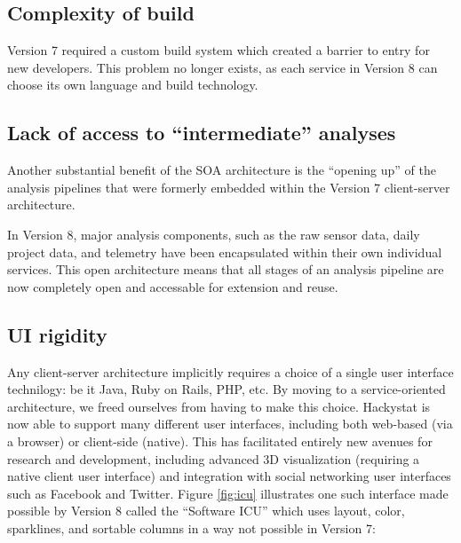 \documentclass[conference,compsoc]{IEEEtran}
\begin{document}





\subsection{Complexity of build}

Version 7 required a custom build system which created a barrier to entry
for new developers.  This problem no longer exists, as each service in
Version 8 can choose its own language and build technology.

\subsection{Lack of access to ``intermediate'' analyses}

Another substantial benefit of the SOA architecture is the ``opening up''
of the analysis pipelines that were formerly embedded within the Version 7
client-server architecture.

In Version 8, major analysis components, such as the raw sensor data, daily
project data, and telemetry have been encapsulated within their own
individual services.  This open architecture means that all stages of an
analysis pipeline are now completely open and accessable for extension and reuse. 

\subsection{UI rigidity}

Any client-server architecture implicitly requires a choice of a single
user interface technilogy: be it Java, Ruby on Rails, PHP, etc.  By moving
to a service-oriented architecture, we freed ourselves from having to make
this choice. Hackystat is now able to support many different user
interfaces, including both web-based (via a browser) or client-side
(native).  This has facilitated entirely new avenues for research and
development, including advanced 3D visualization (requiring a native client
user interface) and integration with social networking user interfaces such
as Facebook and Twitter.  Figure \ref{fig:icu} illustrates one such 
interface made possible by Version 8 called the ``Software ICU'' which uses 
layout, color, sparklines, and sortable columns in a way not possible in Version 7:
\end{document}

